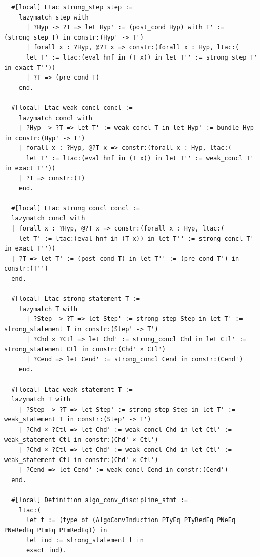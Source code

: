 \begin{lstlisting}
  #[local] Ltac strong_step step :=
    lazymatch step with
      | ?Hyp -> ?T => let Hyp' := (post_cond Hyp) with T' := (strong_step T) in constr:(Hyp' -> T')
      | forall x : ?Hyp, @?T x => constr:(forall x : Hyp, ltac:(
      let T' := ltac:(eval hnf in (T x)) in let T'' := strong_step T' in exact T''))
      | ?T => (pre_cond T)
    end.

  #[local] Ltac weak_concl concl :=
    lazymatch concl with
    | ?Hyp -> ?T => let T' := weak_concl T in let Hyp' := bundle Hyp in constr:(Hyp' -> T')
    | forall x : ?Hyp, @?T x => constr:(forall x : Hyp, ltac:(
      let T' := ltac:(eval hnf in (T x)) in let T'' := weak_concl T' in exact T''))
    | ?T => constr:(T)
    end.

  #[local] Ltac strong_concl concl :=
  lazymatch concl with
  | forall x : ?Hyp, @?T x => constr:(forall x : Hyp, ltac:(
    let T' := ltac:(eval hnf in (T x)) in let T'' := strong_concl T' in exact T''))
  | ?T => let T' := (post_cond T) in let T'' := (pre_cond T') in constr:(T'')
  end.

  #[local] Ltac strong_statement T :=
    lazymatch T with
      | ?Step -> ?T => let Step' := strong_step Step in let T' := strong_statement T in constr:(Step' -> T')
      | ?Chd × ?Ctl => let Chd' := strong_concl Chd in let Ctl' := strong_statement Ctl in constr:(Chd' × Ctl')
      | ?Cend => let Cend' := strong_concl Cend in constr:(Cend')
    end.

  #[local] Ltac weak_statement T :=
  lazymatch T with
    | ?Step -> ?T => let Step' := strong_step Step in let T' := weak_statement T in constr:(Step' -> T')
    | ?Chd × ?Ctl => let Chd' := weak_concl Chd in let Ctl' := weak_statement Ctl in constr:(Chd' × Ctl')
    | ?Chd × ?Ctl => let Chd' := weak_concl Chd in let Ctl' := weak_statement Ctl in constr:(Chd' × Ctl')
    | ?Cend => let Cend' := weak_concl Cend in constr:(Cend')
  end.

  #[local] Definition algo_conv_discipline_stmt := 
    ltac:(
      let t := (type of (AlgoConvInduction PTyEq PTyRedEq PNeEq PNeRedEq PTmEq PTmRedEq)) in
      let ind := strong_statement t in
      exact ind).


\end{lstlisting}
